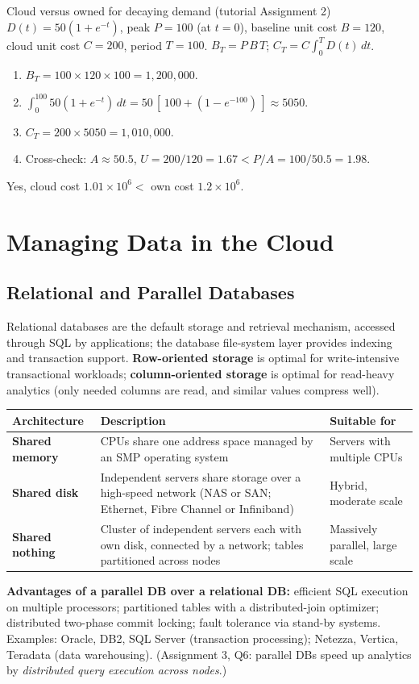 \begin{solved}{Cloud versus owned for decaying demand (tutorial Assignment 2)}
\Given $D(t) = 50(1 + e^{-t})$, peak $P=100$ (at $t=0$), baseline unit cost $B = 120$, cloud unit cost $C = 200$, period $T = 100$.
\Formula $B_T = P\,B\,T$; $C_T = C\int_0^T D(t)\,dt$.
\Steps
\begin{enumerate}[leftmargin=*]
  \item $B_T = 100 \times 120 \times 100 = 1{,}200{,}000$.
  \item $\int_0^{100} 50(1 + e^{-t})\,dt = 50\,[\,100 + (1 - e^{-100})\,] \approx 5050$.
  \item $C_T = 200 \times 5050 = 1{,}010{,}000$.
  \item Cross-check: $A \approx 50.5$, $U = 200/120 = 1.67 < P/A = 100/50.5 = 1.98$.
\end{enumerate}
\Answer Yes, cloud cost $1.01\times10^6 <$ own cost $1.2\times10^6$.
\end{solved}

\section{Managing Data in the Cloud}
\subsection{Relational and Parallel Databases}
Relational databases are the default storage and retrieval mechanism, accessed through SQL by applications; the
database file-system layer provides indexing and transaction support. \textbf{Row-oriented storage} is optimal
for write-intensive transactional workloads; \textbf{column-oriented storage} is optimal for read-heavy analytics
(only needed columns are read, and similar values compress well).

\begin{center}
\begin{tabularx}{\textwidth}{>{\bfseries}lXX}
\toprule
Architecture & Description & Suitable for\\
\midrule
Shared memory & CPUs share one address space managed by an SMP operating system & Servers with multiple CPUs\\
Shared disk & Independent servers share storage over a high-speed network (NAS or SAN; Ethernet, Fibre Channel or Infiniband)
& Hybrid, moderate scale\\
Shared nothing & Cluster of independent servers each with own disk, connected by a network; tables partitioned across nodes &
Massively parallel, large scale\\
\bottomrule
\end{tabularx}
\end{center}
\textbf{Advantages of a parallel DB over a relational DB:} efficient SQL execution on multiple processors; partitioned tables with a
distributed-join optimizer; distributed two-phase commit locking; fault tolerance via stand-by systems.
Examples: Oracle, DB2, SQL Server (transaction processing); Netezza, Vertica, Teradata (data warehousing).
(Assignment 3, Q6: parallel DBs speed up analytics by \emph{distributed query execution across nodes}.)

